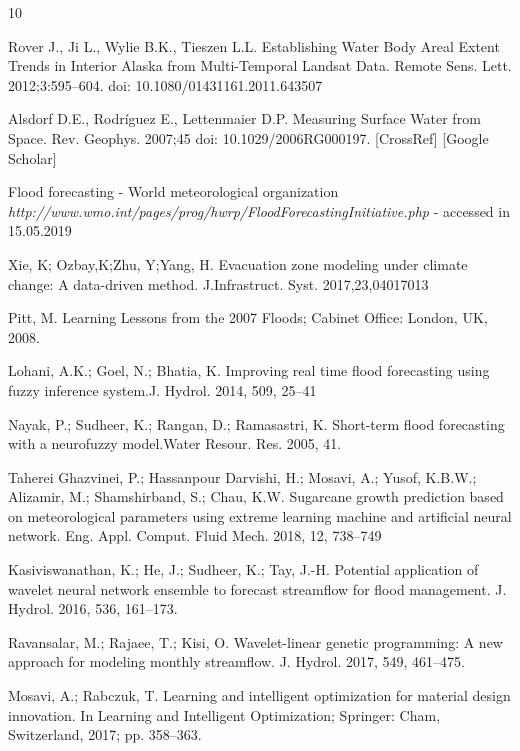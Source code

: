 \documentclass[12pt, a4paper]{report}
\begin{document}
\begin{thebibliography} {10}

 Rover J., Ji L., Wylie B.K., Tieszen L.L. Establishing Water Body Areal Extent Trends in Interior Alaska from Multi-Temporal Landsat Data. Remote Sens. Lett. 2012;3:595–604. doi: 10.1080/01431161.2011.643507

 Alsdorf D.E., Rodríguez E., Lettenmaier D.P. Measuring Surface Water from Space. Rev. Geophys. 2007;45 doi: 10.1029/2006RG000197. [CrossRef] [Google Scholar]

Flood forecasting - World meteorological organization \textit{http://www.wmo.int/pages/prog/hwrp/FloodForecastingInitiative.php} - accessed in 15.05.2019


 Xie, K; Ozbay,K;Zhu, Y;Yang, H. Evacuation zone modeling under climate change: A data-driven method. J.Infrastruct. Syst. 2017,23,04017013

Pitt, M.	Learning Lessons from the 2007 Floods; Cabinet Office: London, UK, 2008.

Lohani, A.K.; Goel, N.; Bhatia, K. Improving real time flood forecasting using fuzzy inference system.J. Hydrol. 2014, 509, 25–41

Nayak, P.; Sudheer, K.; Rangan, D.; Ramasastri, K. Short-term flood forecasting with a neurofuzzy model.Water Resour. Res. 2005, 41.

Taherei Ghazvinei, P.; Hassanpour Darvishi, H.; Mosavi, A.; Yusof, K.B.W.; Alizamir, M.; Shamshirband, S.; Chau, K.W. Sugarcane growth prediction based on meteorological parameters using extreme learning machine and artificial neural network. Eng. Appl. Comput. Fluid Mech. 2018, 12, 738–749

Kasiviswanathan, K.; He, J.; Sudheer, K.; Tay, J.-H. Potential application of wavelet neural network ensemble to forecast streamflow for flood management. J. Hydrol. 2016, 536, 161–173.

Ravansalar, M.; Rajaee, T.; Kisi, O. Wavelet-linear genetic programming: A new approach for modeling monthly streamflow. J. Hydrol. 2017, 549, 461–475.

Mosavi, A.; Rabczuk, T. Learning and intelligent optimization for material design innovation. In Learning and Intelligent Optimization; Springer: Cham, Switzerland, 2017; pp. 358–363.


\end{thebibliography}
\end{document}
